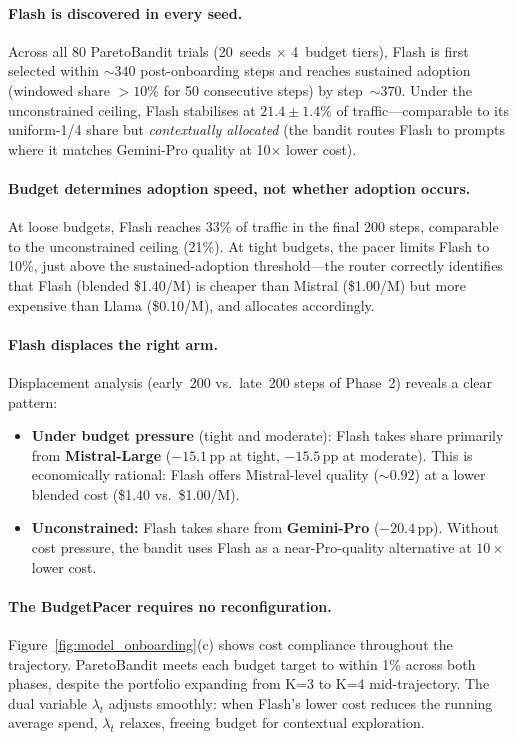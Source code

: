 \paragraph{Flash is discovered in every seed.}
Across all 80 ParetoBandit trials (20~seeds $\times$ 4~budget tiers),
Flash is first selected within ${\sim}340$ post-onboarding steps and
reaches sustained adoption (windowed share $>10$\% for 50
consecutive steps) by step~${\sim}370$.
Under the unconstrained ceiling, Flash stabilises at
$21.4 \pm 1.4$\% of traffic---comparable to its uniform-1/4 share
but \emph{contextually allocated} (the bandit routes Flash to
prompts where it matches Gemini-Pro quality at 10$\times$ lower
cost).

\paragraph{Budget determines adoption speed, not whether adoption occurs.}
At loose budgets, Flash reaches 33\% of traffic in the final 200
steps, comparable to the unconstrained ceiling (21\%).
At tight budgets, the pacer limits Flash to 10\%, just above the
sustained-adoption threshold---the router correctly identifies
that Flash (blended \$1.40/M) is cheaper than Mistral (\$1.00/M)
but more expensive than Llama (\$0.10/M), and allocates accordingly.

\paragraph{Flash displaces the right arm.}
Displacement analysis (early~200 vs.\ late~200 steps of Phase~2)
reveals a clear pattern:
\begin{itemize}[nosep,leftmargin=*]
  \item \textbf{Under budget pressure} (tight and moderate):
    Flash takes share primarily from \textbf{Mistral-Large}
    ($-15.1$\,pp at tight, $-15.5$\,pp at moderate).
    This is economically rational: Flash offers Mistral-level quality
    (${\sim}0.92$) at a lower blended cost (\$1.40 vs.\ \$1.00/M).
  \item \textbf{Unconstrained:} Flash takes share from
    \textbf{Gemini-Pro} ($-20.4$\,pp).  Without cost pressure, the
    bandit uses Flash as a near-Pro-quality alternative at
    $10\times$ lower cost.
\end{itemize}

\paragraph{The BudgetPacer requires no reconfiguration.}
Figure~\ref{fig:model_onboarding}(c) shows cost compliance
throughout the trajectory.
ParetoBandit meets each budget target to within 1\% across both
phases, despite the portfolio expanding from K=3 to K=4
mid-trajectory.
The dual variable $\lambda_t$ adjusts smoothly: when Flash's
lower cost reduces the running average spend, $\lambda_t$ relaxes,
freeing budget for contextual exploration.

